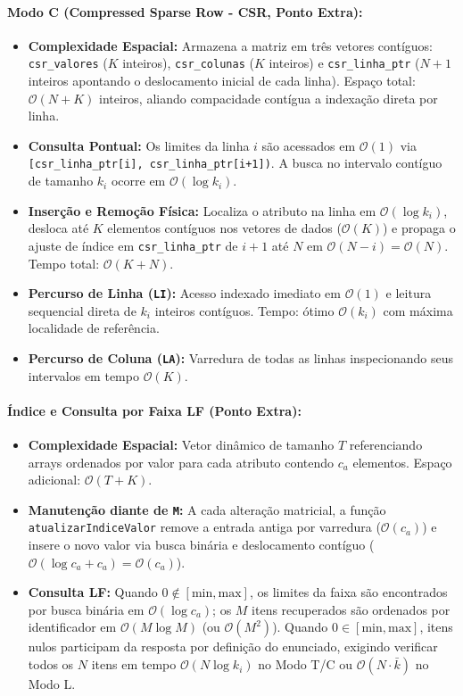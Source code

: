\documentclass[letterpaper]{article}
\begin{document}
\paragraph{Modo C (Compressed Sparse Row - CSR, Ponto Extra):}
\begin{itemize}
    \item \textbf{Complexidade Espacial:} Armazena a matriz em três vetores contíguos: \texttt{csr\_valores} ($K$ inteiros), \texttt{csr\_colunas} ($K$ inteiros) e \texttt{csr\_linha\_ptr} ($N+1$ inteiros apontando o deslocamento inicial de cada linha). Espaço total: $\mathcal{O}(N + K)$ inteiros, aliando compacidade contígua a indexação direta por linha.
    \item \textbf{Consulta Pontual:} Os limites da linha $i$ são acessados em $\mathcal{O}(1)$ via \texttt{[csr\_linha\_ptr[i], csr\_linha\_ptr[i+1])}. A busca no intervalo contíguo de tamanho $k_i$ ocorre em $\mathcal{O}(\log k_i)$.
    \item \textbf{Inserção e Remoção Física:} Localiza o atributo na linha em $\mathcal{O}(\log k_i)$, desloca até $K$ elementos contíguos nos vetores de dados ($\mathcal{O}(K)$) e propaga o ajuste de índice em \texttt{csr\_linha\_ptr} de $i+1$ até $N$ em $\mathcal{O}(N - i) = \mathcal{O}(N)$. Tempo total: $\mathcal{O}(K + N)$.
    \item \textbf{Percurso de Linha (\texttt{LI}):} Acesso indexado imediato em $\mathcal{O}(1)$ e leitura sequencial direta de $k_i$ inteiros contíguos. Tempo: ótimo $\mathcal{O}(k_i)$ com máxima localidade de referência.
    \item \textbf{Percurso de Coluna (\texttt{LA}):} Varredura de todas as linhas inspecionando seus intervalos em tempo $\mathcal{O}(K)$.
\end{itemize}

\paragraph{Índice e Consulta por Faixa LF (Ponto Extra):}
\begin{itemize}
    \item \textbf{Complexidade Espacial:} Vetor dinâmico de tamanho $T$ referenciando arrays ordenados por valor para cada atributo contendo $c_a$ elementos. Espaço adicional: $\mathcal{O}(T + K)$.
    \item \textbf{Manutenção diante de \texttt{M}:} A cada alteração matricial, a função \texttt{atualizarIndiceValor} remove a entrada antiga por varredura ($\mathcal{O}(c_a)$) e insere o novo valor via busca binária e deslocamento contíguo ($\mathcal{O}(\log c_a + c_a) = \mathcal{O}(c_a)$).
    \item \textbf{Consulta LF:} Quando $0 \notin [\text{min}, \text{max}]$, os limites da faixa são encontrados por busca binária em $\mathcal{O}(\log c_a)$; os $M$ itens recuperados são ordenados por identificador em $\mathcal{O}(M \log M)$ (ou $\mathcal{O}(M^2)$). Quando $0 \in [\text{min}, \text{max}]$, itens nulos participam da resposta por definição do enunciado, exigindo verificar todos os $N$ itens em tempo $\mathcal{O}(N \log k_i)$ no Modo T/C ou $\mathcal{O}(N \cdot \bar{k})$ no Modo L.
\end{itemize}
\end{document}
